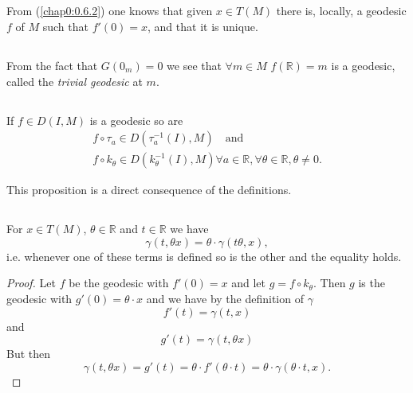 \setcounter{subsection}{3}

\subsection{}\label{chap1:1.2.4}

\begin{remarks*}
From (\ref{chap0:0.6.2}) one knows that given $x\in T(M)$ there is, locally,
a geodesic $f$ of $M$ such that $f'(0)=x$, and that it is unique. 
\end{remarks*}

\setcounter{subsection}{4}

\subsection{}\label{chap1:1.2.5}
From the fact that $G(0_{m})=0$ we see that $\forall m\in M$
$f(\mathbb{R})=m$ is a geodesic, called the {\em trivial geodesic} at
$m$. 


\subsection{}\label{chap1:1.2.6}

\begin{prop*}
If $f\in D(I,M)$ is a geodesic so are 
\begin{gather*}
f\circ \tau_{a}\in D(\tau^{-1}_{a}(I), M)\quad\text{and}\\
f\circ k_{\theta}\in D(k^{-1}_{\theta}(I),M)\forall a\in
\mathbb{R},\forall \theta\in \mathbb{R}, \theta\neq 0.
\end{gather*}
\end{prop*}

This proposition is a direct consequence of the definitions.

\subsection{}\label{chap1:1.2.7}


\begin{coro*}
For $x\in T(M)$, $\theta\in \mathbb{R}$ and $t\in \mathbb{R}$ we have
$$
\gamma(t,\theta x)=\theta\cdot \gamma(t\theta,x),
$$
i.e. whenever one of these terms is defined so is the other and the
equality holds.
\end{coro*}

\begin{proof}
Let $f$ be the geodesic with $f'(0)=x$ and let $g=f\circ
k_{\theta}$. Then $g$ is the geodesic with $g'(0)=\theta\cdot x$ and
we have by the definition \pageoriginale of $\gamma$
$$
f'(t)=\gamma(t,x)
$$
and
$$
g'(t)=\gamma(t,\theta x)
$$
But then
$$
\gamma(t,\theta x)=g'(t)=\theta\cdot f'(\theta\cdot t)=\theta\cdot
\gamma(\theta\cdot t,x).
$$
\end{proof}

